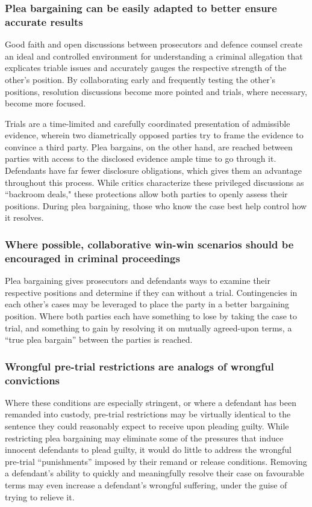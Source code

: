 \subsubsection{Plea bargaining can be easily adapted to better ensure accurate results}

Good faith and open discussions between prosecutors and defence counsel create an ideal and controlled environment for understanding a criminal allegation that explicates triable issues and accurately gauges the respective strength of the other's position. By collaborating early and frequently testing the other's positions, resolution discussions become more pointed and trials, where necessary, become more focused. 

Trials are a time-limited and carefully coordinated presentation of admissible evidence, wherein two diametrically opposed parties try to frame the evidence to convince a third party. Plea bargains, on the other hand, are reached between parties with access to the disclosed evidence ample time to go through it. Defendants have far fewer disclosure obligations, which gives them an advantage throughout this process. While critics characterize these privileged discussions as ``backroom deals," these protections allow both parties to openly assess their positions. During plea bargaining, those who know the case best help control how it resolves.

\subsubsection{Where possible, collaborative win-win scenarios should be encouraged in criminal proceedings}

Plea bargaining gives prosecutors and defendants ways to examine their respective positions and determine if they can without a trial. Contingencies in each other's cases may be leveraged to place the party in a better bargaining position. Where both parties each have something to lose by taking the case to trial, and something to gain by resolving it on mutually agreed-upon terms, a ``true plea bargain'' between the parties is reached. 

\subsubsection{Wrongful pre-trial restrictions are analogs of wrongful convictions}

Where these conditions are especially stringent, or where a defendant has been remanded into custody, pre-trial restrictions may be virtually identical to the sentence they could reasonably expect to receive upon pleading guilty. While restricting plea bargaining may eliminate some of the pressures that induce innocent defendants to plead guilty, it would do little to address the wrongful pre-trial ``punishments'' imposed by their remand or release conditions. Removing a defendant's ability to quickly and meaningfully resolve their case on favourable terms may even increase a defendant's wrongful suffering, under the guise of trying to relieve it.


